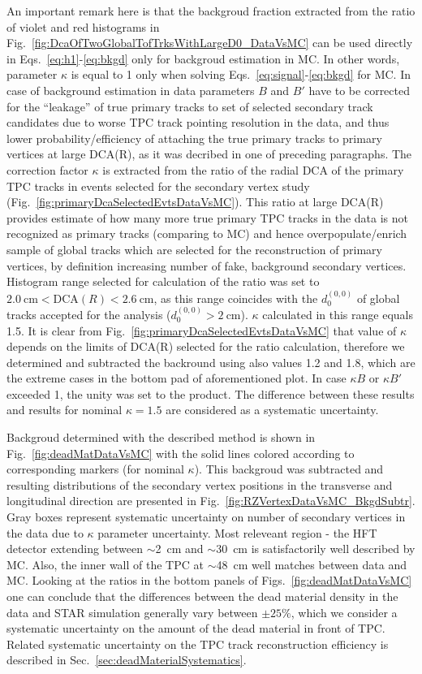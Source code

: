 An important remark here is that the backgroud fraction extracted from the ratio of violet and red histograms in Fig.~\ref{fig:DcaOfTwoGlobalTofTrksWithLargeD0_DataVsMC} can be used directly in Eqs.~\eqref{eq:h1}-\eqref{eq:bkgd} only for backgroud estimation in MC. In other words, parameter $\kappa$ is equal to 1 only when solving Eqs.~\eqref{eq:signal}-\eqref{eq:bkgd} for MC. In case of background estimation in data parameters $B$ and $B'$ have to be corrected for the ``leakage'' of true primary tracks to set of selected secondary track candidates due to worse TPC track pointing resolution in the data, and thus lower probability/efficiency of attaching the true primary tracks to primary vertices at large DCA(R), as it was decribed in one of preceding paragraphs. The correction factor $\kappa$ is extracted from the ratio of the radial DCA of the primary TPC tracks in events selected for the secondary vertex study (Fig.~\ref{fig:primaryDcaSelectedEvtsDataVsMC}). This ratio at large DCA(R) provides estimate of how many more true primary TPC tracks in the data is not recognized as primary tracks (comparing to MC) and hence overpopulate/enrich sample of global tracks which are selected for the reconstruction of primary vertices, by definition increasing number of fake, background secondary vertices. Histogram range selected for calculation of the ratio was set to $2.0~\text{cm}<\text{DCA}(R)<2.6~\text{cm}$, as this range coincides with the $d_{0}^{(0,0)}$ of global tracks accepted for the analysis ($d_{0}^{(0,0)}>2~\text{cm}$). $\kappa$ calculated in this range equals 1.5. It is clear from Fig.~\ref{fig:primaryDcaSelectedEvtsDataVsMC} that value of $\kappa$ depends on the limits of DCA(R) selected for the ratio calculation, therefore we determined and subtracted the backround using also values 1.2 and 1.8, which are the extreme cases in the bottom pad of aforementioned plot. In case $\kappa B$ or $\kappa B'$ exceeded 1, the unity was set to the product. The difference between these results and results for nominal $\kappa=1.5$ are considered as a systematic uncertainty.

Backgroud determined with the described method is shown in Fig.~\ref{fig:deadMatDataVsMC} with the solid lines colored according to corresponding markers (for nominal $\kappa$). This backgroud was subtracted and resulting distributions of the secondary vertex positions in the transverse and longitudinal direction are presented in Fig.~\ref{fig:RZVertexDataVsMC_BkgdSubtr}. Gray boxes represent systematic uncertainty on number of secondary vertices in the data due to $\kappa$ parameter uncertainty. Most releveant region - the HFT detector extending between $\sim$2~cm and $\sim$30~cm is satisfactorily well described by MC. Also, the inner wall of the TPC at $\sim$48~cm well matches between data and MC. Looking at the ratios in the bottom panels of Figs.~\ref{fig:deadMatDataVsMC} one can conclude that the differences between the dead material density in the data and STAR simulation generally vary between $\pm25\%$, which we consider a systematic uncertainty on the amount of the dead material in front of TPC. Related systematic uncertainty on the TPC track reconstruction efficiency is described in Sec.~\ref{sec:deadMaterialSystematics}.



